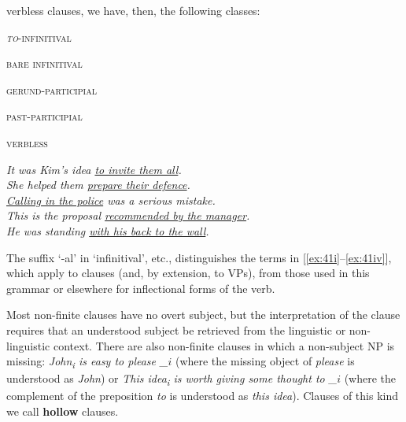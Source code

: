 \noindent verbless clauses, we have, then, the following classes:
\begin{examples}
    \item \label{ex:41}
    \noindent\begin{minipage}[t]{0.3\linewidth}\vspace{-6pt}
        \begin{examples}
        \item\label{ex:41i}\textsc{\textit{to}-infinitival}
        \item\label{ex:41ii}\textsc{bare infinitival}
        \item\label{ex:41ii}\textsc{gerund-participial}
        \item\label{ex:41iv}\textsc{past-participial}
        \item\label{ex:41v}\textsc{verbless}
        \end{examples}
    \end{minipage}
    \begin{minipage}[t]{0.7\linewidth}
        \textit{It was Kim's idea \uline{to invite them all}.}\\
        \textit{She helped them \uline{prepare their defence}.}\\
        \textit{\uline{Calling in the police} was a serious mistake.}\\
        \textit{This is the proposal \uline{recommended by the manager}.}\\
        \textit{He was standing \uline{with his back to the wall}.}
    \end{minipage}
\end{examples}
The suffix `-al' in `infinitival', etc., distinguishes the terms in [\ref{ex:41i}--\ref{ex:41iv}], which apply to clauses (and, by extension, to VPs), from those used in this grammar or elsewhere for inflectional forms of the verb.

Most non-finite clauses have no overt subject, but the interpretation of the clause requires that an understood subject be retrieved from the linguistic or non-linguistic context. There are also non-finite clauses in which a non-subject NP is missing: \textit{John\textsubscript{i} is easy \ob to please \_$i$\cb} (where the missing object of \textit{please} is understood as \textit{John}) or \textit{This idea\textsubscript{i} is worth \ob giving some thought to \_$i$\cb} (where the complement of the preposition \textit{to} is understood as \textit{this idea}). Clauses of this kind we call \textbf{hollow} clauses.

